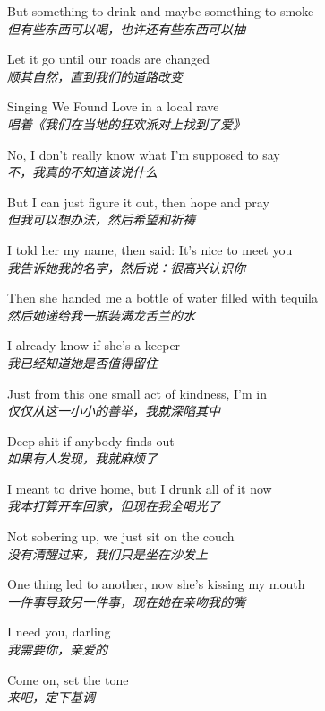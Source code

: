 \begin{spacing}{1.5}
\begin{flushleft}
But something to drink and maybe something to smoke\\
\textit{但有些东西可以喝，也许还有些东西可以抽}\lyricspace

Let it go until our roads are changed\\
\textit{顺其自然，直到我们的道路改变}\lyricspace

Singing We Found Love in a local rave\\
\textit{唱着《我们在当地的狂欢派对上找到了爱》}\lyricspace

No, I don't really know what I'm supposed to say\\
\textit{不，我真的不知道该说什么}\lyricspace

But I can just figure it out, then hope and pray\\
\textit{但我可以想办法，然后希望和祈祷}\lyricspace

I told her my name, then said: It's nice to meet you\\
\textit{我告诉她我的名字，然后说：很高兴认识你}\lyricspace

Then she handed me a bottle of water filled with tequila\\
\textit{然后她递给我一瓶装满龙舌兰的水}\lyricspace

I already know if she's a keeper\\
\textit{我已经知道她是否值得留住}\lyricspace

Just from this one small act of kindness, I'm in\\
\textit{仅仅从这一小小的善举，我就深陷其中}\lyricspace

Deep shit if anybody finds out\\
\textit{如果有人发现，我就麻烦了}\lyricspace

I meant to drive home, but I drunk all of it now\\
\textit{我本打算开车回家，但现在我全喝光了}\lyricspace

Not sobering up, we just sit on the couch\\
\textit{没有清醒过来，我们只是坐在沙发上}\lyricspace

One thing led to another, now she's kissing my mouth\\
\textit{一件事导致另一件事，现在她在亲吻我的嘴}\lyricspace

I need you, darling\\
\textit{我需要你，亲爱的}\lyricspace

Come on, set the tone\\
\textit{来吧，定下基调}\lyricspace


\end{flushleft}
\end{spacing}
